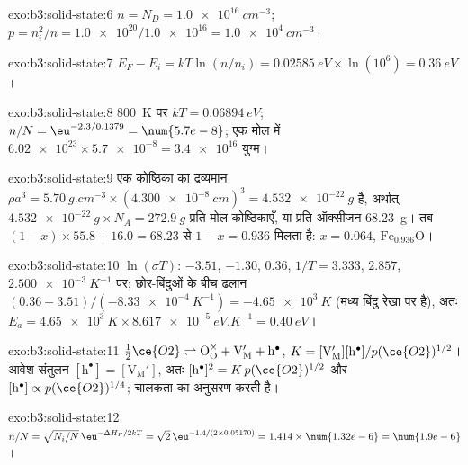 \begin{solution}{exo:b3:solid-state:6}
$n = N_D = \qty{1.0e16}{cm^{-3}}$; $p = n_i^2/n = \num{1.0e20}/\num{1.0e16} = \qty{1.0e4}{cm^{-3}}$।
\end{solution}

\begin{solution}{exo:b3:solid-state:7}
$E_F - E_i = kT\ln(n/n_i) = \qty{0.02585}{eV} \times \ln(10^6) = \qty{0.36}{eV}$।
\end{solution}

\begin{solution}{exo:b3:solid-state:8}
\qty{800}{K} पर $kT = \qty{0.06894}{eV}$; $n/N = \eu^{-2.3/0.1379} = \num{5.7e-8}$; एक मोल में $\num{6.02e23} \times \num{5.7e-8} = \num{3.4e16}$
युग्म।
\end{solution}

\begin{solution}{exo:b3:solid-state:9}
एक कोष्ठिका का द्रव्यमान $\rho a^3 = \qty{5.70}{g.cm^{-3}} \times (\qty{4.300e-8}{cm})^3 = \qty{4.532e-22}{g}$ है, अर्थात्
$\qty{4.532e-22}{g} \times N_A = \qty{272.9}{g}$ प्रति मोल कोष्ठिकाएँ, या प्रति ऑक्सीजन \qty{68.23}{g}। तब
$(1 - x) \times 55.8 + 16.0 = 68.23$ से $1 - x = 0.936$ मिलता है: $x = 0.064$, $\mathrm{Fe_{0.936}O}$।
\end{solution}

\begin{solution}{exo:b3:solid-state:10}
$\ln(\sigma T)$: $-3.51$, $-1.30$, $0.36$, $1/T = 3.333$, $2.857$, $\qty{2.500e-3}{K^{-1}}$ पर; छोर-बिंदुओं के बीच ढलान
$(0.36 + 3.51)/(-\qty{8.33e-4}{K^{-1}}) = -\qty{4.65e3}{K}$ (मध्य बिंदु रेखा पर है), अतः
$E_a = \qty{4.65e3}{K} \times \qty{8.617e-5}{eV.K^{-1}} = \qty{0.40}{eV}$।
\end{solution}

\begin{solution}{exo:b3:solid-state:11}
$\tfrac12\ce{O2} \rightleftharpoons \mathrm{O_O^{\times} + V_M' + h^{\bullet}}$, $K = [\mathrm{V_M'}][\mathrm h^\bullet]/p(\ce{O2})^{1/2}$। आवेश संतुलन $[\mathrm h^\bullet] = [\mathrm{V_M'}]$, अतः
$[\mathrm h^\bullet]^2 = K\,p(\ce{O2})^{1/2}$ और $[\mathrm h^\bullet] \propto p(\ce{O2})^{1/4}$; चालकता  का अनुसरण करती है।
\end{solution}

\begin{solution}{exo:b3:solid-state:12}
$n/N = \sqrt{N_i/N}\,\eu^{-\Delta H_F/2kT} = \sqrt 2\,\eu^{-1.4/(2 \times 0.05170)} = 1.414 \times \num{1.32e-6} = \num{1.9e-6}$।
\end{solution}

